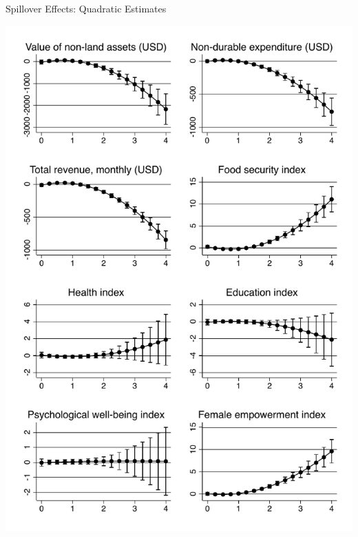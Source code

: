 \documentclass[14pt, aspectratio=169]{beamer}
\begin{document}
 
\begin{frame}{Spillover Effects: Quadratic Estimates}

\centering
\begin{minipage}{.48\linewidth}
    \includegraphics[height=0.66\textheight, trim={0 10cm 0 0}, clip]{../Figs/indices_ppp_margins.pdf}


\end{minipage}
\end{frame}
\end{document}
